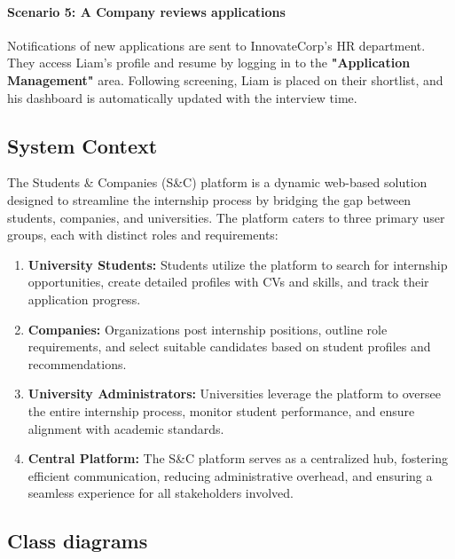 \paragraph{Scenario 5: A Company reviews applications}
Notifications of new applications are sent to InnovateCorp's HR department. They access Liam's profile and resume by logging in to the \textbf{"Application Management"} area. Following screening, Liam is placed on their shortlist, and his dashboard is automatically updated with the interview time.

\subsection{System Context}
The Students \& Companies (S\&C) platform is a dynamic web-based solution designed to streamline the internship process by bridging the gap between students, companies, and universities. The platform caters to three primary user groups, each with distinct roles and requirements:

\begin{enumerate}
    \item \textbf{University Students:} Students utilize the platform to search for internship opportunities, create detailed profiles with CVs and skills, and track their application progress.
    \item \textbf{Companies:} Organizations post internship positions, outline role requirements, and select suitable candidates based on student profiles and recommendations.
    \item \textbf{University Administrators:}
    Universities leverage the platform to oversee the entire internship process, monitor student performance, and ensure alignment with academic standards.
    \item \textbf{Central Platform:} The S\&C platform serves as a centralized hub, fostering efficient communication, reducing administrative overhead, and ensuring a seamless experience for all stakeholders involved.
\end{enumerate}

\newpage

\subsection{Class diagrams}
\label{subsec:class_diagrams}%


